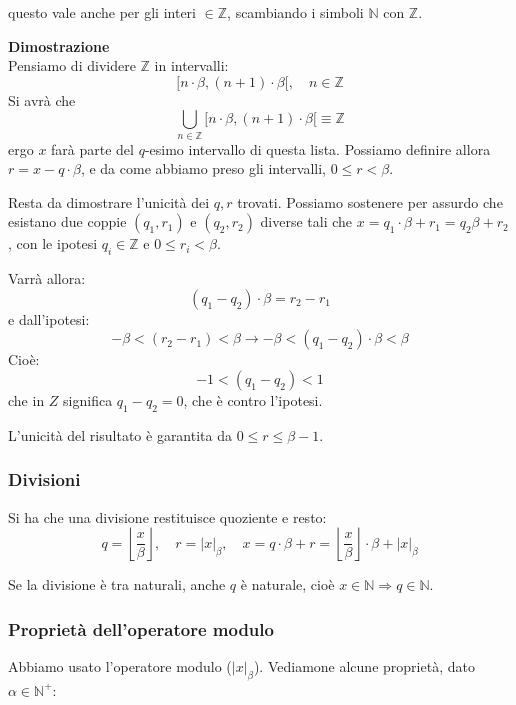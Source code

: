 \documentclass[a4paper,11pt]{article}
\begin{document}
questo vale anche per gli interi $\in \mathbb{Z}$, scambiando i simboli $\mathbb{N}$ con $\mathbb{Z}$.

\par\medskip
\noindent
\textbf{\textsf{Dimostrazione}} \\
Pensiamo di dividere $\mathbb{Z}$ in intervalli:
$$
[n \cdot \beta, (n+1) \cdot \beta[, \quad n \in \mathbb{Z}
$$
Si avrà che 
$$
\bigcup_{n \in \mathbb{Z}} [n \cdot \beta, (n+1) \cdot \beta[ \equiv \mathbb{Z}
$$
ergo $x$ farà parte del $q$-esimo intervallo di questa lista.
Possiamo definire allora $r = x - q \cdot \beta$, e da come abbiamo preso gli intervalli, $0 \leq r < \beta$.

Resta da dimostrare l'unicità dei $q,r$ trovati.
Possiamo sostenere per assurdo che esistano due coppie $(q_1,r_1)$ e $(q_2,r_2)$ diverse tali che $ x = q_1 \cdot \beta + r_1 = q_2 \beta + r_2$, con le ipotesi $q_i \in \mathbb{Z}$ e $0 \leq r_i < \beta$.

Varrà allora:
$$ (q_1 - q_2) \cdot \beta = r_2 - r_1 $$
e dall'ipotesi:
$$ -\beta < (r_2 - r_1) < \beta \rightarrow -\beta < (q_1 - q_2) \cdot \beta < \beta $$
Cioè:
$$ -1 < (q_1 - q_2) < 1 $$
che in $Z$ significa $q_1 - q_2 = 0$, che è contro l'ipotesi.

L'unicità del risultato è garantita da $0 \leq r \leq \beta - 1$. 

\subsubsection{Divisioni}
Si ha che una divisione restituisce quoziente e resto:
$$
q = \left\lfloor \frac{x}{\beta} \right\rfloor, \quad r = |x|_\beta, \quad x = q \cdot \beta + r = \left\lfloor \frac{x}{\beta} \right\rfloor \cdot \beta + |x|_\beta
$$

Se la divisione è tra naturali, anche $q$ è naturale, cioè $x \in \mathbb{N} \Rightarrow q \in \mathbb{N}$.

\subsubsection{Proprietà dell'operatore modulo}
Abbiamo usato l'operatore modulo ($|x|_\beta$). Vediamone alcune proprietà, dato $\alpha \in \mathbb{N}^+$:
\end{document}

